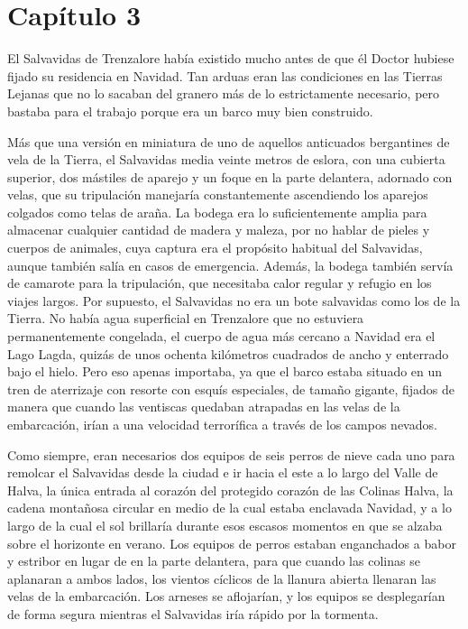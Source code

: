 \chapter*{Capítulo 3}

El Salvavidas de Trenzalore había existido mucho antes de que él Doctor hubiese fijado su residencia en Navidad. Tan arduas eran las condiciones en las Tierras Lejanas que no lo sacaban del granero más de lo estrictamente necesario, pero bastaba para el trabajo porque era un barco muy bien construido.
 
Más que una versión en miniatura de uno de aquellos anticuados bergantines de vela de la Tierra, el Salvavidas media veinte metros de eslora, con una cubierta superior, dos mástiles de aparejo y un foque en la parte delantera, adornado con velas, que su tripulación manejaría constantemente ascendiendo los aparejos colgados como telas de araña. La bodega era lo suficientemente amplia para almacenar cualquier cantidad de madera y maleza, por no hablar de pieles y cuerpos de animales, cuya captura era el propósito habitual del Salvavidas, aunque también salía en casos de emergencia. Además, la bodega también servía de camarote para la tripulación, que necesitaba calor regular y refugio en los viajes largos. Por supuesto, el Salvavidas no era un bote salvavidas como los de la Tierra. No había agua superficial en Trenzalore que no estuviera permanentemente congelada, el cuerpo de agua más cercano a Navidad era el Lago Lagda, quizás de unos ochenta kilómetros cuadrados de ancho y enterrado bajo el hielo. Pero eso apenas importaba, ya que el barco estaba situado en un tren de aterrizaje con resorte con esquís especiales, de tamaño gigante, fijados de manera que cuando las ventiscas quedaban atrapadas en las velas de la embarcación, irían a una velocidad terrorífica a través de los campos nevados.
 
Como siempre, eran necesarios dos equipos de seis perros de nieve cada uno para remolcar el Salvavidas desde la ciudad e ir hacia el este a lo largo del Valle de Halva, la única entrada al corazón del protegido corazón de las Colinas Halva, la cadena montañosa circular en medio de la cual estaba enclavada Navidad, y a lo largo de la cual el sol brillaría durante esos escasos momentos en que se alzaba sobre el horizonte en verano. Los equipos de perros estaban enganchados a babor y estribor en lugar de en la parte delantera, para que cuando las colinas se aplanaran a ambos lados, los vientos cíclicos de la llanura abierta llenaran las velas de la embarcación. Los arneses se aflojarían, y los equipos se desplegarían de forma segura mientras el Salvavidas iría rápido por la tormenta.
 
